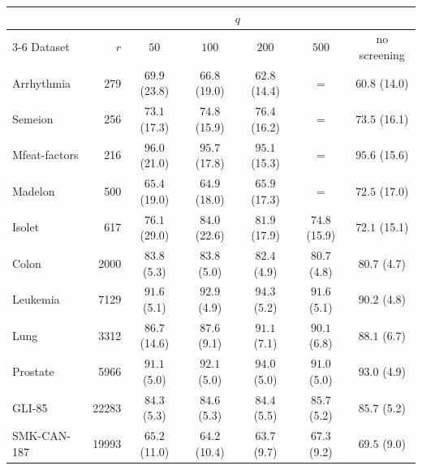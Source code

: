 \begin{minipage}{\linewidth}
\centering
{}
\label{tab:screen}
\footnotesize
\setlength{\tabcolsep}{3pt}
\begin{tabular}{@{}lrccccc@{}}
\toprule
 & & \multicolumn{4}{c}{$q$} & \\ \cmidrule(lr){3-6}
Dataset & $r$ & $50$ & $100$ & $200$ & $500$ & no screening \\
\midrule
Arrhythmia & 279 & $69.9$ (23.8) & $66.8$ (19.0) & $62.8$ (14.4) & = & $60.8$ (14.0) \\
Semeion & 256 & $73.1$ (17.3) & $74.8$ (15.9) & $76.4$ (16.2) & = & $73.5$ (16.1) \\
Mfeat-factors & 216 & $96.0$ (21.0) & $95.7$ (17.8) & $95.1$ (15.3) & = & $95.6$ (15.6) \\
Madelon & 500 & $65.4$ (19.0) & $64.9$ (18.0) & $65.9$ (17.3) & = & $72.5$ (17.0) \\
Isolet & 617 & $76.1$ (29.0) & $84.0$ (22.6) & $81.9$ (17.9) & $74.8$ (15.9) & $72.1$ (15.1) \\
Colon & 2000 & $83.8$ (5.3) & $83.8$ (5.0) & $82.4$ (4.9) & $80.7$ (4.8) & $80.7$ (4.7) \\
Leukemia & 7129 & $91.6$ (5.1) & $92.9$ (4.9) & $94.3$ (5.2) & $91.6$ (5.1) & $90.2$ (4.8) \\
Lung & 3312 & $86.7$ (14.6) & $87.6$ (9.1) & $91.1$ (7.1) & $90.1$ (6.8) & $88.1$ (6.7) \\
Prostate & 5966 & $91.1$ (5.0) & $92.1$ (5.0) & $94.0$ (5.0) & $91.0$ (5.0) & $93.0$ (4.9) \\
GLI-85 & 22283 & $84.3$ (5.3) & $84.6$ (5.3) & $84.4$ (5.5) & $85.7$ (5.2) & $85.7$ (5.2) \\
SMK-CAN-187 & 19993 & $65.2$ (11.0) & $64.2$ (10.4) & $63.7$ (9.7) & $67.3$ (9.2) & $69.5$ (9.0) \\
\bottomrule
\end{tabular}
\end{minipage}\par
